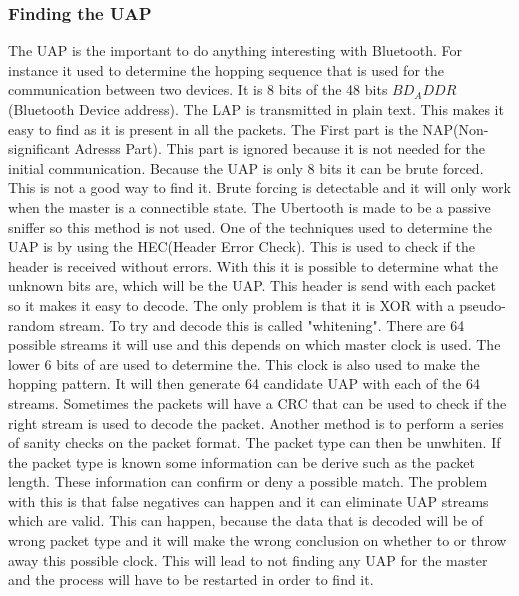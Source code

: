 \subsubsection{Finding the UAP}
\label{subsubsec:finding_uap}
The UAP is the important to do anything interesting with Bluetooth. For instance it used to determine the hopping sequence that is used for the communication between two devices. It is 8 bits of the 48 bits $BD_ADDR$ (Bluetooth Device address). The LAP is transmitted in plain text. This makes it easy to find as it is present in all the packets. The First part is the NAP(Non-significant Adresss Part). This part is ignored because it is not needed for the initial communication. Because the UAP is only 8 bits it can be brute forced. This is not a good way to find it. Brute forcing is detectable and it will only work when the master is a connectible state. \pend
The Ubertooth is made to be a passive sniffer so this method is not used. One of the techniques used to determine the UAP is by using the HEC(Header Error Check). This is used to check if the header is received without errors. With this it is possible to determine what the unknown bits are, which will be the UAP. This header is send with each packet so it makes it easy to decode. The only problem is that it is XOR with a pseudo-random stream. To try and decode this is called "whitening". There are 64 possible streams it will use and this depends on which master clock is used. The lower 6 bits of are used to determine the. This clock is also used to make the hopping pattern. It will then generate 64 candidate UAP with each of the 64 streams. Sometimes the packets will have a CRC that can be used to check if the right stream is used to decode the packet. \pend
Another method is to perform a series of sanity checks on the packet format. The packet type can then be unwhiten. If the packet type is known some information can be derive such as the packet length. These information can confirm or deny a possible match. The problem with this is that false negatives can happen and it can eliminate UAP streams which are valid. This can happen, because the data that is decoded will be of wrong packet type and it will make the wrong conclusion on whether to or throw away this possible clock. This will lead to not finding any UAP for the master and the process will have to be restarted in order to find it. \pend